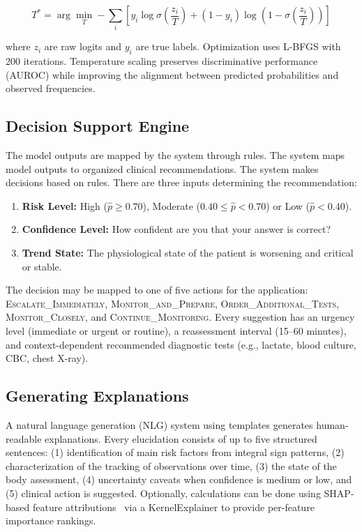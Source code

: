 \documentclass[runningheads]{llncs}
\begin{document}
\begin{equation}
T^* = \arg\min_T -\sum_{i} \left[ y_i \log \sigma\!\left(\frac{z_i}{T}\right) + (1 - y_i) \log\!\left(1 - \sigma\!\left(\frac{z_i}{T}\right)\right) \right]
\end{equation}

where $z_i$ are raw logits and $y_i$ are true labels. Optimization uses L-BFGS with 200 iterations. Temperature scaling preserves discriminative performance (AUROC) while improving the alignment between predicted probabilities and observed frequencies.

\subsection{Decision Support Engine}

The model outputs are mapped by the system through rules. The system maps model outputs to organized clinical recommendations. The system makes decisions based on rules. There are three inputs determining the recommendation:

\begin{enumerate}
    \item \textbf{Risk Level:} High ($\hat{p} \geq 0.70$), Moderate ($0.40 \leq \hat{p} < 0.70$) or Low ($\hat{p} < 0.40$).
    \item \textbf{Confidence Level:} How confident are you that your answer is correct?
    \item \textbf{Trend State:} The physiological state of the patient is worsening and critical or stable.
\end{enumerate}

The decision may be mapped to one of five actions for the application: \textsc{Escalate\_\allowbreak Immediately}, \textsc{Monitor\_\allowbreak and\_\allowbreak Prepare}, \textsc{Order\_\allowbreak Additional\_\allowbreak Tests}, \textsc{Monitor\_\allowbreak Closely}, and \textsc{Continue\_\allowbreak Monitoring}. Every suggestion has an urgency level (immediate or urgent or routine), a reassessment interval (15--60 minutes), and context-dependent recommended diagnostic tests (e.g., lactate, blood culture, CBC, chest X-ray).

\subsection{Generating Explanations}

A natural language generation (NLG) system using templates generates human-readable explanations. Every elucidation consists of up to five structured sentences: (1) identification of main risk factors from integral sign patterns, (2) characterization of the tracking of observations over time, (3) the state of the body assessment, (4) uncertainty caveats when confidence is medium or low, and (5) clinical action is suggested. Optionally, calculations can be done using SHAP-based feature attributions~\cite{Lundberg2017} via a KernelExplainer to provide per-feature importance rankings.
\end{document}
